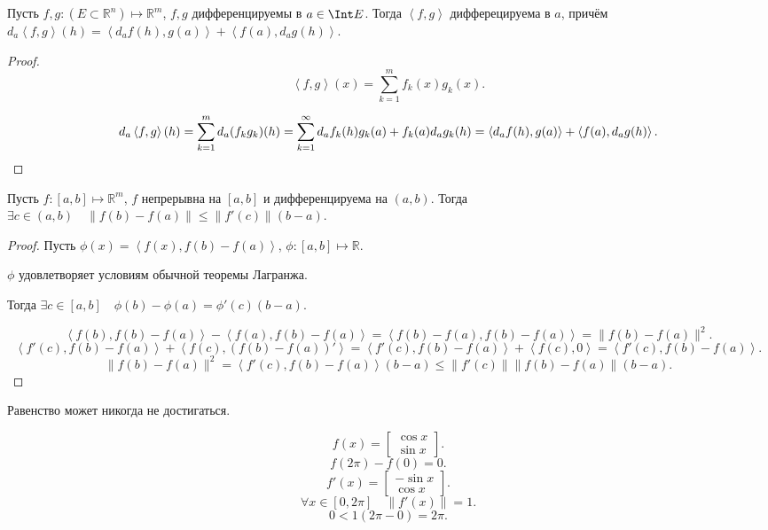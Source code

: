 \begin{theorem} \thmslashn

    Пусть $f, g : (E \subset \mathbb{R}^{n}) \mapsto \mathbb{R}^{m}$, $f,g$ дифференцируемы в $a\in \Int E$. Тогда $\left<f, g\right>$ дифферецируема в $a$, причём $d_{a}\left<f, g\right>(h) = \left<d_{a}f(h), g(a)\right> + \left<f(a), d_{a}g(h)\right>$.
    \begin{proof} \thmslashn
    
        \[ \left<f, g\right>(x) = \sum\limits_{k=1}^{m} f_{k}(x)g_{k}(x) .\]

        \[ d_{a}\left<f, g\right>(h) = \sum\limits_{k=1}^{m} d_{a}(f_{k}g_{k})(h) = \sum\limits_{k=1}^{\infty} d_{a}f_{k}(h)g_{k}(a) + f_{k}(a)d_{a}g_{k}(h) = \left<d_{a}f(h), g(a)\right> + \left<f(a), d_{a}g(h)\right>. \qedhere\] 
    \end{proof}
\end{theorem}
\begin{theorem} \thmslashn

    Пусть $f : [a, b] \mapsto \mathbb{R}^{m}$, $f$ непрерывна на $[a, b]$ и дифференцируема на $(a, b)$. Тогда $\exists{c\in (a, b)}\quad \|f(b) - f(a)\| \le \|f'(c)\|(b-a)$.
    \begin{proof} \thmslashn
    
        Пусть $\phi(x) = \left<f(x), f(b) - f(a)\right>$, $\phi : [a, b] \mapsto \mathbb{R}$.

        $\phi$ удовлетворяет условиям обычной теоремы Лагранжа.

        Тогда $\exists{c\in [a, b]}\quad \phi(b) - \phi(a) = \phi'(c)(b-a)$.

        \[ \left<f(b), f(b) - f(a)\right> - \left<f(a), f(b)-f(a)\right> = \left<f(b)-f(a), f(b)-f(a)\right> = \|f(b)-f(a)\|^2 .\]
        \[ \left<f'(c), f(b)-f(a)\right> + \left<f(c), (f(b) - f(a))'\right> = \left<f'(c), f(b)-f(a)\right> + \left<f(c), 0\right> = \left<f'(c), f(b)-f(a)\right>.\] 
        \[ \|f(b)-f(a)\|^2 = \left<f'(c), f(b)-f(a)\right>(b-a) \le \|f'(c)\| \|f(b)-f(a)\|(b-a).\] 
    \end{proof}
\end{theorem}
\begin{remark} \thmslashn

    Равенство может никогда не достигаться.

    \[ f(x) = \begin{bmatrix} \cos x\\ \sin x \end{bmatrix}  .\] 
    \[ f(2\pi) - f(0) = 0 .\]
    \[ f'(x) = \begin{bmatrix} -\sin x\\ \cos x \end{bmatrix}  .\] 
    \[ \forall{x\in [0, 2\pi]}\quad \|f'(x)\| = 1 .\]
    \[ 0 < 1(2\pi-0) = 2\pi .\] 
\end{remark}
